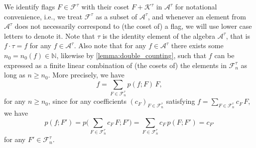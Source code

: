 \documentclass[a4paper,11pt]{article}
\numberwithin{equation}{section}
\newcommand{\mA}{\mathcal{A}}
\newcommand{\mK}{\mathcal{K}}
\newcommand{\mF}{\mathcal{F}}
\newcommand{\NN}{\mathbb{N}}
\begin{document}
We identify flags $F \in \mF^\tau$ with their coset $F + \mK^\tau$ in $\mA^\tau$ for notational convenience, i.e., we treat $\mF^\tau$ as a subset of $\mA^\tau$, and whenever an element from $\mA^\tau$ does not necessarily correspond to (the coset of) a flag, we will use lower case letters to denote it. Note that $\tau$ is the identity element of the algebra $\mA^\tau$, that is $f \cdot \tau = f$ for any $f \in \mA^\tau$. Also note that for any $f \in \mA^\tau$ there exists some $n_0 = n_0(f) \in \NN$, likewise by \cref{lemma:double_counting}, such that $f$ can be expressed as a finite linear combination of (the cosets of) the elements in $\mF^\tau_{n}$ as long as $n \geq n_0$. More precisely, we have
%
\begin{equation*}
    f = \sum_{F \in \mF^\tau_{ n}} p(f; F) \, F,
\end{equation*}
%
for any $n \geq n_0$, since for any coefficients $(c_F)_{F \in \mF^\tau_{ n}}$ satisfying  $f = \sum_{F \in \mF^\tau_{ n}} c_F \, F$, we have
%
\begin{equation*}
    p(f; F') = p\Big( \sum_{F \in \mF^\tau_{ n}} c_F \, F; F' \Big) =  \sum_{F \in \mF^\tau_{ n}} c_F \, p(F; F') = c_{F'}
\end{equation*}
%
for any $F' \in \mF^\tau_{ n}$.
%
\end{document}
